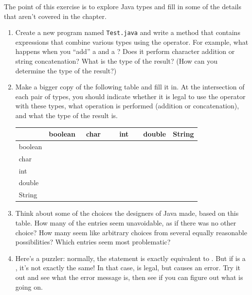 \begin{exercise}  %

The point of this exercise is to explore Java types and fill in some of the details that aren't covered in the chapter.


\begin{enumerate}

\item Create a new program named {\tt Test.java} and write a  method that contains expressions that combine various types using the \java{+} operator.
For example, what happens when you ``add'' a  and a ?
Does it perform character addition or string concatenation?
What is the type of the result?
(How can you determine the type of the result?)

\item Make a bigger copy of the following table and fill it in.
At the intersection of each pair of types, you should indicate whether it is legal to use the \java{+} operator with these types, what operation is performed (addition or concatenation), and what the type of the result is.

\begin{center}
\begin{tabular}{|l|l|l|l|l|l|} \hline
        &  boolean  &  ~char~  &  ~~int~~  &  double  &  String \\ \hline
boolean &           &          &           &          &         \\ \hline
char    &           &          &           &          &         \\ \hline
int     &           &          &           &          &         \\ \hline
double  &           &          &           &          &         \\ \hline
String  &           &          &           &          &         \\ \hline
\end{tabular}
\end{center}

\item Think about some of the choices the designers of Java made, based on this table.
How many of the entries seem unavoidable, as if there was no other choice?
How many seem like arbitrary choices from several equally reasonable possibilities?
Which entries seem most problematic?

\item Here's a puzzler: normally, the statement  is exactly equivalent to .
But if  is a , it's not exactly the same!
In that case,  is legal, but  causes an error.
Try it out and see what the error message is, then see if you can figure out what is going on.


\end{enumerate}
\end{exercise}
